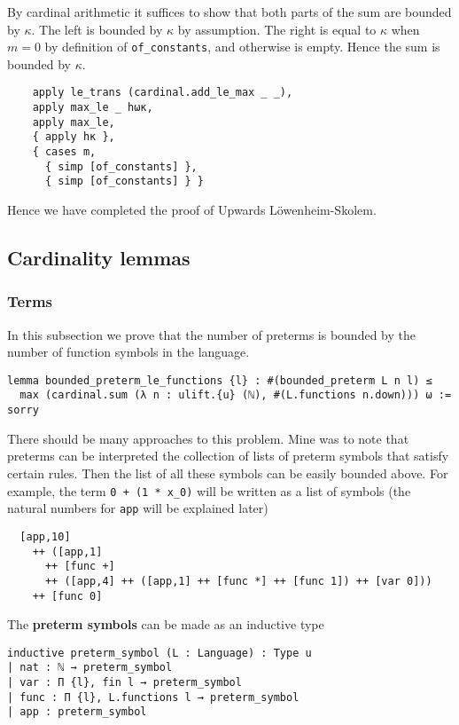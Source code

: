 By cardinal arithmetic it suffices to show that both parts of the
sum are bounded by $\kappa$.
The left is bounded by $\kappa$ {by assumption}.
The right is equal to $\kappa$ when $m = 0$ by definition of
\texttt{of\_constants}, and otherwise is empty.
Hence the sum is bounded by $\kappa$.

\begin{lstlisting}
    apply le_trans (cardinal.add_le_max _ _),
    apply max_le _ hωκ,
    apply max_le,
    { apply hκ },
    { cases m,
      { simp [of_constants] },
      { simp [of_constants] } } \end{lstlisting}

Hence we have completed the proof of Upwards L\"{o}wenheim-Skolem.

\subsection{Cardinality lemmas}

\subsubsection{Terms}

In this subsection we prove that the number of preterms is bounded by
the number of function symbols in the language.

\begin{lstlisting}
lemma bounded_preterm_le_functions {l} : #(bounded_preterm L n l) ≤
  max (cardinal.sum (λ n : ulift.{u} (ℕ), #(L.functions n.down))) ω := sorry \end{lstlisting}

There should be many approaches to this problem.
Mine was to note that preterms can be interpreted
the collection of lists of preterm symbols that satisfy certain rules.
Then the list of all these symbols can be easily bounded above.
For example, the term \texttt{0 + (1 * x\_0)}
will be written as a list of symbols
(the natural numbers for \texttt{app} will be explained later)
\begin{lstlisting}
  [app,10]
    ++ ([app,1]
      ++ [func +]
      ++ ([app,4] ++ ([app,1] ++ [func *] ++ [func 1]) ++ [var 0]))
    ++ [func 0]
\end{lstlisting}

The \textbf{preterm symbols} can be made as an inductive type
\begin{lstlisting}
inductive preterm_symbol (L : Language) : Type u
| nat : ℕ → preterm_symbol
| var : Π {l}, fin l → preterm_symbol
| func : Π {l}, L.functions l → preterm_symbol
| app : preterm_symbol \end{lstlisting}

